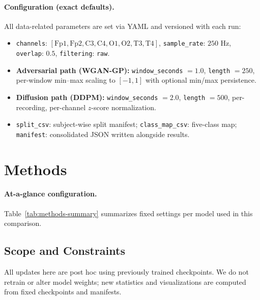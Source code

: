 \documentclass{article}
\begin{document}
\paragraph{Configuration (exact defaults).}
All data-related parameters are set via YAML and versioned with each run:
\begin{itemize}
\item \texttt{channels}: \([ \text{Fp1}, \text{Fp2}, \text{C3}, \text{C4}, \text{O1}, \text{O2}, \text{T3}, \text{T4} ]\), \quad \texttt{sample\_rate}: \(250\) Hz, \quad \texttt{overlap}: \(0.5\), \quad \texttt{filtering}: \texttt{raw}.
\item \textbf{Adversarial path (WGAN-GP):} \texttt{window\_seconds} \(= 1.0\), \texttt{length} \(= 250\), per-window min--max scaling to \([-1,1]\) with optional min/max persistence.
\item \textbf{Diffusion path (DDPM):} \texttt{window\_seconds} \(= 2.0\), \texttt{length} \(= 500\), per-recording, per-channel \(z\)-score normalization.
\item \texttt{split\_csv}: subject-wise split manifest; \texttt{class\_map\_csv}: five-class map; \texttt{manifest}: consolidated JSON written alongside results.
\end{itemize}



\section{Methods}
\paragraph{At-a-glance configuration.} Table~\ref{tab:methods-summary} summarizes fixed settings per model used in this comparison.

\begin{table}[t]
  \centering
  \caption{Methods summary (auto-generated from YAML).}
  \label{tab:methods-summary}
  
\end{table}

\subsection{Scope and Constraints}
All updates here are post hoc using previously trained checkpoints. We do not retrain or alter model weights; new statistics and visualizations are computed from fixed checkpoints and manifests.
\end{document}
